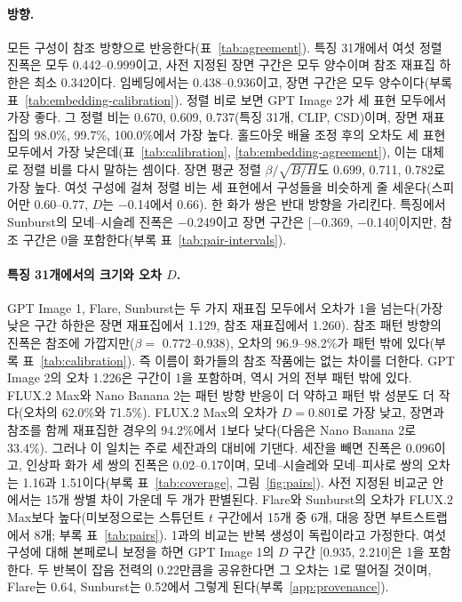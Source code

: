 \documentclass[10pt]{article}
\begin{document}
\paragraph{방향.} 모든 구성이 참조 방향으로 반응한다(표~\ref{tab:agreement}). 특징 31개에서 여섯 정렬
진폭은 모두 0.442--0.999이고, 사전 지정된 장면 구간은 모두 양수이며 참조 재표집 하한은 최소 0.342이다.
임베딩에서는 0.438--0.936이고, 장면 구간은 모두 양수이다(부록 표~\ref{tab:embedding-calibration}). 정렬
비로 보면 GPT Image 2가 세 표현 모두에서 가장 좋다. 그 정렬 비는 0.670, 0.609, 0.737(특징 31개, CLIP,
CSD)이며, 장면 재표집의 98.0\%, 99.7\%, 100.0\%에서 가장 높다. 홀드아웃 배율 조정 후의 오차도 세 표현
모두에서 가장 낮은데(표~\ref{tab:calibration}, \ref{tab:embedding-agreement}), 이는 대체로 정렬 비를
다시 말하는 셈이다. 장면 평균 정렬 $\beta/\sqrt{B/H}$도 0.699, 0.711, 0.782로 가장 높다. 여섯 구성에
걸쳐 정렬 비는 세 표현에서 구성들을 비슷하게 줄 세운다(스피어만 0.60--0.77, $D$는 $-$0.14에서 0.66).
한 화가 쌍은 반대 방향을 가리킨다. 특징에서 Sunburst의 모네--시슬레 진폭은 $-$0.249이고 장면 구간은
[$-$0.369, $-$0.140]이지만, 참조 구간은 0을 포함한다(부록 표~\ref{tab:pair-intervals}).

\paragraph{특징 31개에서의 크기와 오차 $D$.} GPT Image 1, Flare, Sunburst는 두 가지 재표집 모두에서
오차가 1을 넘는다(가장 낮은 구간 하한은 장면 재표집에서 1.129, 참조 재표집에서 1.260). 참조 패턴
방향의 진폭은 참조에 가깝지만($\beta=$ 0.772--0.938), 오차의 96.9--98.2\%가 패턴 밖에 있다(부록
표~\ref{tab:calibration}). 즉 이름이 화가들의 참조 작품에는 없는 차이를 더한다. GPT Image 2의 오차
1.226은 구간이 1을 포함하며, 역시 거의 전부 패턴 밖에 있다. FLUX.2 Max와 Nano Banana 2는 패턴 방향
반응이 더 약하고 패턴 밖 성분도 더 작다(오차의 62.0\%와 71.5\%). FLUX.2 Max의 오차가 $D=0.801$로 가장
낮고, 장면과 참조를 함께 재표집한 경우의 94.2\%에서 1보다 낮다(다음은 Nano Banana 2로 33.4\%). 그러나
이 일치는 주로 세잔과의 대비에 기댄다. 세잔을 빼면 진폭은 0.096이고, 인상파 화가 세 쌍의 진폭은
0.02--0.17이며, 모네--시슬레와 모네--피사로 쌍의 오차는 1.16과 1.51이다(부록 표~\ref{tab:coverage},
그림~\ref{fig:pairs}). 사전 지정된 비교군 안에서는 15개 쌍별 차이 가운데 두 개가 판별된다. Flare와
Sunburst의 오차가 FLUX.2 Max보다 높다(미보정으로는 스튜던트 $t$ 구간에서 15개 중 6개, 대응 장면
부트스트랩에서 8개; 부록 표~\ref{tab:pairs}). 1과의 비교는 반복 생성이 독립이라고 가정한다. 여섯
구성에 대해 본페로니 보정을 하면 GPT Image 1의 $D$ 구간 [0.935, 2.210]은 1을 포함한다. 두 반복이 잡음
전력의 0.22만큼을 공유한다면 그 오차는 1로 떨어질 것이며, Flare는 0.64, Sunburst는 0.52에서 그렇게
된다(부록~\ref{app:provenance}).
\end{document}

